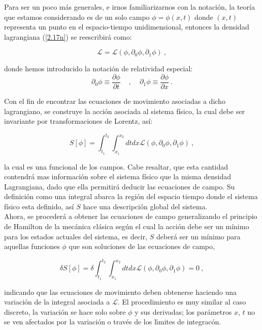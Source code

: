 Para ser un poco más generales, e irnos familiarizarnos con la notación, la teoría que estamos considerando es de un solo campo $\phi=\phi(x,t)$ donde $(x,t)$ representa un punto en el espacio-tiempo unidimensional, entonces la densidad lagrangiana (\ref{2.17n}) se reescribirá como:

\begin{equation}
    \mathcal{L}=\mathcal{L}(\phi,\partial_{0}\phi,\partial_{1}\phi)~,
\end{equation}

\noindent
donde hemos introducido la notación de relatividad especial:
\begin{equation*}
    \partial_{0}\phi \equiv \frac{\partial \phi}{\partial t}~~~~~,~~~~~\partial_{1}\phi \equiv \frac{\partial \phi}{\partial x}~.
\end{equation*}


Con el fin de encontrar las ecuaciones de movimiento asociadas a dicho lagrangiano, se construye la acción asociada al sistema físico, la cual debe ser invariante por transformaciones de Lorentz, así:

\begin{equation}
    S[\phi]=\int_{t_{1}}^{t_{2}} \int_{x_{1}}^{x_{2}} dt dx \mathcal{L}(\phi,\partial_{0}\phi,\partial_{1}\phi)~,
\end{equation}

\noindent
la cual es una funcional de los campos. Cabe resaltar, que esta cantidad contendrá mas información sobre el sistema físico que la misma densidad Lagrangiana, dado que ella permitirá deducir las ecuaciones de campo. Su definición como una integral abarca la región del espacio tiempo donde el sistema físico esta definido, así $S$ hace una descripción global del sistema.\\

Ahora, se procederá a obtener las ecuaciones de campo generalizando el principio de Hamilton de la mecánica clásica según el cual la acción debe ser un mínimo para los estados actuales del sistema, es decir, $S$ deberá ser un mínimo para aquellas funciones $\phi$ que son soluciones de las ecuaciones de campo,

\begin{equation}
    \delta S[\phi]=\delta \int_{t_{1}}^{t_{2}} \int_{x_{1}}^{x_{2}} dt dx \mathcal{L}(\phi,\partial_{0}\phi,\partial_{1}\phi)=0~,  \label{2.17o}
\end{equation}


\noindent
indicando que las ecuaciones de movimiento deben obtenerse haciendo una variaci\'{o}n de la integral asociada a $\mathcal{L}$. El procedimiento es muy similar al caso discreto, la variaci\'{o}n se hace solo sobre $\phi$ y sus derivadas; los par\'{a}metros $x$, $t$ no se ven afectados por la variaci\'{o}n o trav\'{e}s de los l\'{\i}mites de integrac\'{o}n.\\


